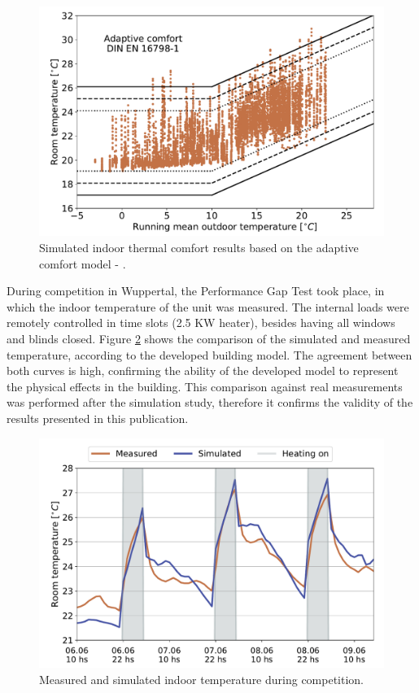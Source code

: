 \documentclass[twocolumn, a4paper,10pt]{article}
\begin{document}
\begin{figure}[H]
\centering
\includegraphics[scale=0.34]{img/HDU_adcomf.pdf}
\caption{Simulated indoor thermal comfort results based on the adaptive comfort model - \cite{DIN16798}.}
\label{fig:HDU_adcomf}
\end{figure}

During competition in Wuppertal, the Performance Gap Test took place, in which the indoor temperature of the unit was measured. The internal loads were remotely controlled in time slots (2.5 KW heater), besides having all windows and blinds closed. Figure \ref{fig:Mess_PGC} shows the comparison of the simulated and measured temperature, according to the developed building model. The agreement between both curves is high, confirming the ability of the developed model to represent the physical effects in the building. This comparison against real measurements was performed after the simulation study, therefore it confirms the validity of the results presented in this publication.  

\vspace{-5pt} 
\begin{figure}[H]
\centering
\includegraphics[scale=0.34]{img/Mess_PGC.pdf}
\caption{Measured and simulated indoor temperature during competition.}
\label{fig:Mess_PGC}
\end{figure}
\end{document}
